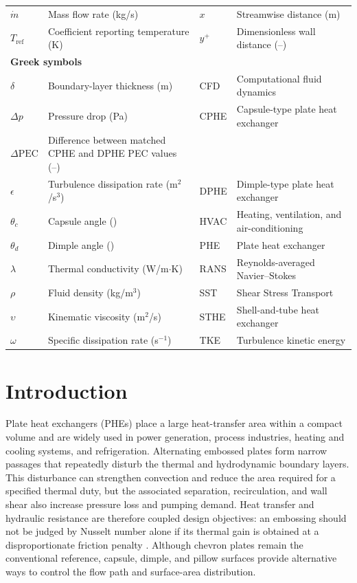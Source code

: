 \documentclass[energies,article,submit,moreauthors,noheaderline]{Definitions/mdpi}
\newcommand{\degree}{\texorpdfstring{\ensuremath{^\circ}}{\textdegree}}
\def\ensuremath#1{}%
\def\degree{\textdegree}%
\def\quad{ }%
\begin{document}
\begin{table}[H]
\begin{tabularx}{\textwidth}{@{}l>{\raggedright\arraybackslash}X@{\quad}l>{\raggedright\arraybackslash}X@{}}
$\dot{m}$         & Mass flow rate (kg/s) & $x$         & Streamwise distance (m) \\
$T_{\mathrm{ref}}$ & Coefficient reporting temperature (K) & $y^+$       & Dimensionless wall distance (--) \\
\hline
\multicolumn{2}{l}{\textbf{Greek symbols}} & \multicolumn{2}{l}{\textbf{Abbreviations}} \\
\hline
$\delta$    & Boundary-layer thickness (m) & CFD   & Computational fluid dynamics \\
$\Delta p$  & Pressure drop (Pa) & CPHE  & Capsule-type plate heat exchanger \\
$\Delta\mathrm{PEC}$ & Difference between matched CPHE and DPHE PEC values (--) & & \\
$\epsilon$  & Turbulence dissipation rate (m$^2$/s$^3$) & DPHE  & Dimple-type plate heat exchanger \\
$\theta_c$  & Capsule angle (\degree) & HVAC  & Heating, ventilation, and air-conditioning \\
$\theta_d$  & Dimple angle (\degree) & PHE   & Plate heat exchanger \\
$\lambda$   & Thermal conductivity (W/m$\cdot$K) & RANS  & Reynolds-averaged Navier--Stokes \\
$\rho$      & Fluid density (kg/m$^3$) & SST   & Shear Stress Transport \\
$\upsilon$  & Kinematic viscosity (m$^2$/s) & STHE  & Shell-and-tube heat exchanger \\
$\omega$    & Specific dissipation rate (s$^{-1}$) & TKE   & Turbulence kinetic energy \\          
\hline
\end{tabularx}
\end{table}


\section{Introduction}
\label{sec:introduction} 


Plate heat exchangers (PHEs) place a large heat-transfer area within a compact volume and are widely used in power generation, process industries, heating and cooling systems, and refrigeration. Alternating embossed plates form narrow passages that repeatedly disturb the thermal and hydrodynamic boundary layers. This disturbance can strengthen convection and reduce the area required for a specified thermal duty, but the associated separation, recirculation, and wall shear also increase pressure loss and pumping demand. Heat transfer and hydraulic resistance are therefore coupled design objectives: an embossing should not be judged by Nusselt number alone if its thermal gain is obtained at a disproportionate friction penalty \citep{abukhader2012, thulukkanam2013, zhang2019a}. Although chevron plates remain the conventional reference, capsule, dimple, and pillow surfaces provide alternative ways to control the flow path and surface-area distribution.
\end{document}
